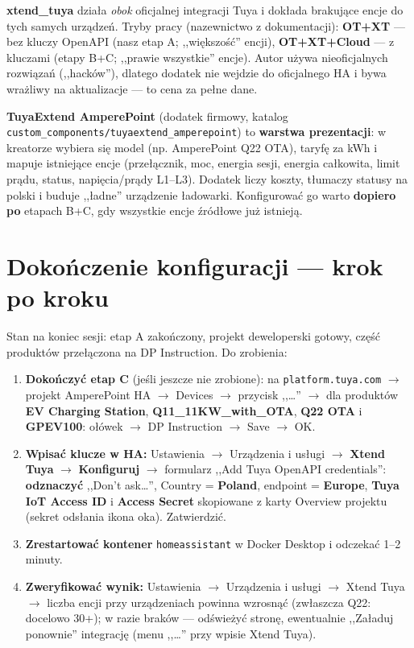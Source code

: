 \documentclass[11pt,a4paper]{article}
\begin{document}
\textbf{xtend\_tuya} działa \emph{obok} oficjalnej integracji Tuya i dokłada brakujące encje do tych samych urządzeń. Tryby pracy (nazewnictwo z dokumentacji): \textbf{OT+XT} --- bez kluczy OpenAPI (nasz etap A; ,,większość'' encji), \textbf{OT+XT+Cloud} --- z kluczami (etapy B+C; ,,prawie wszystkie'' encje). Autor używa nieoficjalnych rozwiązań (,,hacków''), dlatego dodatek nie wejdzie do oficjalnego HA i bywa wrażliwy na aktualizacje --- to cena za pełne dane.

\textbf{TuyaExtend AmperePoint} (dodatek firmowy, katalog \texttt{custom\_components/tuyaextend\_amperepoint}) to \textbf{warstwa prezentacji}: w kreatorze wybiera się model (np. AmperePoint Q22 OTA), taryfę za kWh i mapuje istniejące encje (przełącznik, moc, energia sesji, energia całkowita, limit prądu, status, napięcia/prądy L1--L3). Dodatek liczy koszty, tłumaczy statusy na polski i buduje ,,ładne'' urządzenie ładowarki. Konfigurować go warto \textbf{dopiero po} etapach B+C, gdy wszystkie encje źródłowe już istnieją.

\section{Dokończenie konfiguracji --- krok po kroku}
\label{sec:dokonczenie}

Stan na koniec sesji: etap A zakończony, projekt deweloperski gotowy, część produktów przełączona na DP Instruction. Do zrobienia:

\begin{enumerate}
\item \textbf{Dokończyć etap C} (jeśli jeszcze nie zrobione): na \texttt{platform.tuya.com} $\to$ projekt AmperePoint HA $\to$ Devices $\to$ przycisk ,,\ldots'' $\to$ dla produktów \textbf{EV Charging Station}, \textbf{Q11\_11KW\_with\_OTA}, \textbf{Q22 OTA} i \textbf{GPEV100}: ołówek $\to$ DP Instruction $\to$ Save $\to$ OK.
\item \textbf{Wpisać klucze w HA:} Ustawienia $\to$ Urządzenia i usługi $\to$ \textbf{Xtend Tuya} $\to$ \textbf{Konfiguruj} $\to$ formularz ,,Add Tuya OpenAPI credentials'': \textbf{odznaczyć} ,,Don't ask\ldots'', Country = \textbf{Poland}, endpoint = \textbf{Europe}, \textbf{Tuya IoT Access ID} i \textbf{Access Secret} skopiowane z karty Overview projektu (sekret odsłania ikona oka). Zatwierdzić.
\item \textbf{Zrestartować kontener} \texttt{homeassistant} w Docker Desktop i odczekać 1--2 minuty.
\item \textbf{Zweryfikować wynik:} Ustawienia $\to$ Urządzenia i usługi $\to$ Xtend Tuya $\to$ liczba encji przy urządzeniach powinna wzrosnąć (zwłaszcza Q22: docelowo 30+); w razie braków --- odświeżyć stronę, ewentualnie ,,Załaduj ponownie'' integrację (menu ,,\ldots'' przy wpisie Xtend Tuya).
\end{enumerate}
\end{document}
